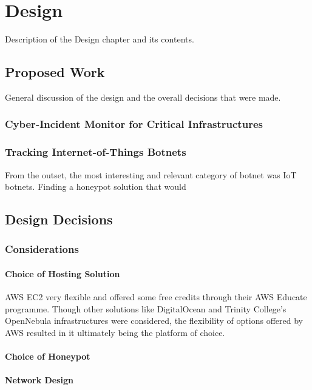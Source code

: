 \chapter{Design}

Description of the Design chapter and its contents.


\section{Proposed Work}

General discussion of the design and the overall decisions that were made.

\subsection{Cyber-Incident Monitor for Critical Infrastructures}

\subsection{Tracking Internet-of-Things Botnets}

From the outset, the most interesting and relevant category of botnet was IoT botnets. Finding a honeypot solution that would

\section{Design Decisions}
	\subsection{Considerations}
		\subsubsection{Choice of Hosting Solution}
		AWS EC2 very flexible and offered some free credits through their AWS Educate programme. Though other solutions like DigitalOcean and Trinity College's OpenNebula infrastructures were considered, the flexibility of options offered by AWS resulted in it ultimately being the platform of choice.
		\subsubsection{Choice of Honeypot}
				
		\subsubsection{Network Design}
